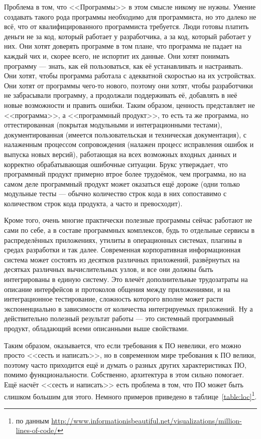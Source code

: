 \documentclass[a5paper]{article}
\begin{document}
Проблема в том, что <<Программы>> в этом смысле никому не нужны. Умение создавать такого рода программы необходимо для программиста, но это далеко не всё, что от квалифицированного программиста требуется. Люди готовы платить деньги не за код, который работает у разработчика, а за код, который работает у них. Они хотят доверять программе в том плане, что программа не падает на каждый чих и, скорее всего, не испортит их данные. Они хотят понимать программу --- знать, как ей пользоваться, как её устанавливать и настраивать. Они хотят, чтобы программа работала с адекватной скоростью на их устройствах. Они хотят от программы чего-то нового, поэтому они хотят, чтобы разработчики не забрасывали программу, а продолжали поддерживать её, добавлять в неё новые возможности и править ошибки. Таким образом, ценность представляет не <<программа>>, а <<программный продукт>>, то есть та же программа, но оттестированная (покрытая модульными и интеграционными тестами), документированная (имеется пользовательская и техническая документация), с налаженным процессом сопровождения (налажен процесс исправления ошибок и выпуска новых версий), работающая на всех возможных входных данных и корректно обрабатывающая ошибочные ситуации. Брукс утверждает, что программный продукт примерно втрое более трудоёмок, чем программа, но на самом деле программный продукт может оказаться ещё дороже (одни только модульные тесты --- обычно количество строк кода в них сопоставимо с количеством строк кода продукта, а часто и превосходит).

Кроме того, очень многие практически полезные программы сейчас работают не сами по себе, а в составе программных комплексов, будь то отдельные сервисы в распределённых приложениях, утилиты в операционных системах, плагины в средах разработки и так далее. Современная корпоративная информационная система может состоять из десятков различных приложений, развёрнутых на десятках различных вычислительных узлов, и все они должны быть интегрированы в единую систему. Это влечёт дополнительные трудозатраты на описание интерфейсов и протоколов общения между приложениями, и на интеграционное тестирование, сложность которого вполне может расти экспоненциально в зависимости от количества интегрируемых приложений. Ну а действительно полезный результат работы --- это системный программный продукт, обладающий всеми описанными выше свойствами.

Таким образом, оказывается, что если требования к ПО невелики, его можно просто <<сесть и написать>>, но в современном мире требования к ПО велики, поэтому часто приходится ещё и думать о разных других характеристиках ПО, помимо функциональности. Собственно, архитектура в этом сильно помогает. Ещё насчёт <<сесть и написать>> есть проблема в том, что ПО может быть слишком большим для этого. Немного примеров приведено в таблице~\ref{table:loc}\footnote{по данным \url{http://www.informationisbeautiful.net/visualizations/million-lines-of-code/}}.
\end{document}
